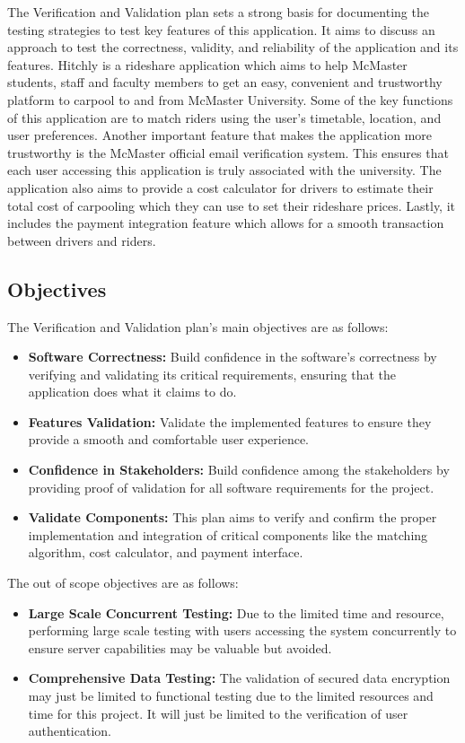 \documentclass[12pt, titlepage]{article}
\begin{document}
The Verification and Validation plan sets a strong basis for documenting the testing strategies 
to test key features of this application. It aims to discuss an approach to test the correctness, 
validity, and reliability of the application and its features. Hitchly is a rideshare application 
which aims to help McMaster students, staff and faculty members to get an easy, convenient and 
trustworthy platform to carpool to and from McMaster University. Some of the key functions of this 
application are to match riders using the user's timetable, location, and user preferences. Another 
important feature that makes the application more trustworthy is the McMaster official email verification 
system. This ensures that each user accessing this application is truly associated with the university. 
The application also aims to provide a cost calculator for drivers to estimate their total cost of carpooling
 which they can use to set their rideshare prices. Lastly, it includes the payment integration feature which 
 allows for a smooth transaction between drivers and riders.  

\subsection{Objectives}
The Verification and Validation plan's main objectives are as follows: 
\begin{itemize}
    \item \textbf{Software Correctness:} Build confidence in the software's correctness by verifying and validating its critical requirements, ensuring that the application does what it claims to do. 
    \item \textbf{Features Validation:} Validate the implemented features to ensure they provide a smooth and comfortable user experience. 
    \item \textbf{Confidence in Stakeholders:} Build confidence among the stakeholders by providing proof of validation for all software requirements for the project.  
    \item \textbf{Validate Components:} This plan aims to verify and confirm the proper implementation and integration of critical components like the matching algorithm, cost calculator, and payment interface. 
\end{itemize}
The out of scope objectives are as follows:
\begin{itemize}
    \item \textbf{Large Scale Concurrent Testing:} Due to the limited time and resource, performing large scale testing with users accessing the system concurrently to ensure server capabilities may be valuable but avoided.  
    \item \textbf{Comprehensive Data Testing:} The validation of secured data encryption may just be limited to functional testing due to the limited resources and time for this project. It will just be limited to the verification of user authentication. 
\end{itemize}
\end{document}
